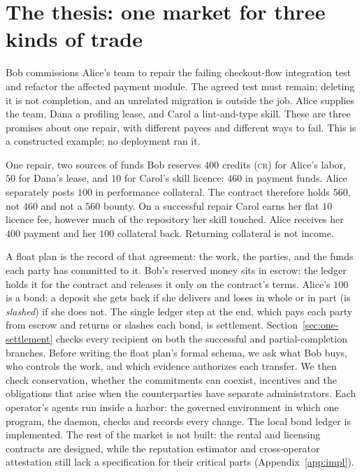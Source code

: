 \documentclass[11pt,a4paper]{article}
\theoremstyle{definition}
\theoremstyle{definition}
\theoremstyle{remark}
\begin{document}
\section{The thesis: one market for three kinds of trade}\label{sec:thesis}

Bob commissions Alice's team to repair the failing checkout-flow integration
test and refactor the affected payment module. The agreed test must remain;
deleting it is not completion, and an unrelated migration is outside the job.
Alice supplies the team, Dana a profiling lease, and Carol a lint-and-type
skill. These are three promises about one repair, with different payees and
different ways to fail. This is a constructed example; no deployment ran it.

\begin{pdexample}{One repair, two sources of funds}
Bob reserves $400$ credits (\textsc{cr}) for Alice's labor, $50$ for Dana's lease,
and $10$ for Carol's skill licence: $460$ in payment funds. Alice separately
posts $100$ in performance collateral. The contract therefore holds $560$,
not $460$ and not a $560$ bounty.
On a successful repair Carol earns her flat $10$ licence fee, however much
of the repository her skill touched. Alice receives her
$400$ payment and her $100$ collateral back. Returning collateral is not
income.
\end{pdexample}

A float plan is the record of that agreement: the work, the parties,
and the funds each party has committed to it. Bob's reserved money sits in
escrow: the ledger holds it for the contract and releases it only on
the contract's terms. Alice's $100$ is a bond: a deposit she gets back
if she delivers and loses in whole or in part (is \emph{slashed}) if she does
not. The single ledger step at the end, which pays each party from escrow and
returns or slashes each bond, is settlement.
Section~\ref{sec:one-settlement} checks every recipient on both the successful
and partial-completion branches.
Before writing the float plan's formal schema, we ask what Bob buys, who controls the work,
and which evidence authorizes each transfer. We then check conservation, whether the commitments can coexist,
incentives and the obligations that arise when the counterparties have
separate administrators. Each operator's agents run inside a harbor: the
governed environment in which one program, the daemon, checks and records
every change. The local bond ledger is implemented. The rest of the market is
not built: the rental and licensing contracts are designed, while the
reputation estimator and cross-operator attestation still lack a specification
for their critical parts (Appendix~\ref{app:impl}).
\end{document}
